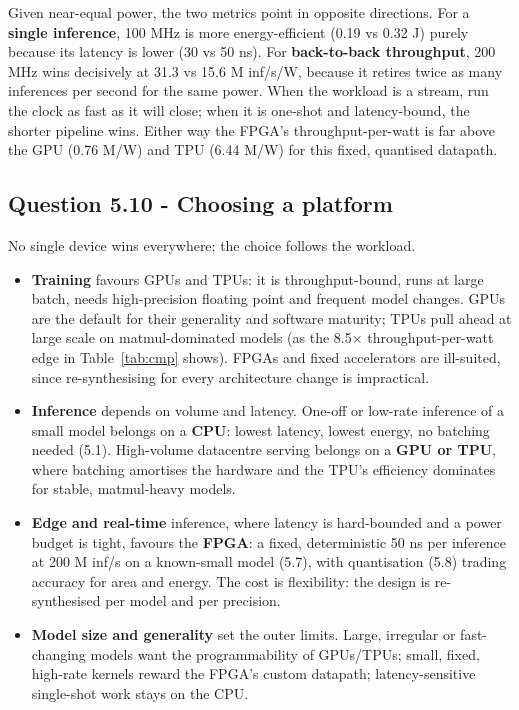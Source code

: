 \documentclass[11pt,a4paper]{article}
\newcommand{\Q}[1]{\subsection*{Question #1}}
\begin{document}
Given near-equal power, the two metrics point in opposite directions. For a \textbf{single inference}, 100 MHz is more energy-efficient (0.19 vs 0.32 \textmu J) purely because its latency is lower (30 vs 50 ns). For \textbf{back-to-back throughput}, 200 MHz wins decisively at 31.3 vs 15.6 M inf/s/W, because it retires twice as many inferences per second for the same power. When the workload is a stream, run the clock as fast as it will close; when it is one-shot and latency-bound, the shorter pipeline wins. Either way the FPGA's throughput-per-watt is far above the GPU (0.76 M/W) and TPU (6.44 M/W) for this fixed, quantised datapath.

\Q{5.10 - Choosing a platform}

No single device wins everywhere; the choice follows the workload.

\begin{itemize}\setlength\itemsep{0.15em}
    \item \textbf{Training} favours GPUs and TPUs: it is throughput-bound, runs at large batch, needs high-precision floating point and frequent model changes. GPUs are the default for their generality and software maturity; TPUs pull ahead at large scale on matmul-dominated models (as the 8.5$\times$ throughput-per-watt edge in Table~\ref{tab:cmp} shows). FPGAs and fixed accelerators are ill-suited, since re-synthesising for every architecture change is impractical.
    \item \textbf{Inference} depends on volume and latency. One-off or low-rate inference of a small model belongs on a \textbf{CPU}: lowest latency, lowest energy, no batching needed (5.1). High-volume datacentre serving belongs on a \textbf{GPU or TPU}, where batching amortises the hardware and the TPU's efficiency dominates for stable, matmul-heavy models.
    \item \textbf{Edge and real-time} inference, where latency is hard-bounded and a power budget is tight, favours the \textbf{FPGA}: a fixed, deterministic 50 ns per inference at 200 M inf/s on a known-small model (5.7), with quantisation (5.8) trading accuracy for area and energy. The cost is flexibility: the design is re-synthesised per model and per precision.
    \item \textbf{Model size and generality} set the outer limits. Large, irregular or fast-changing models want the programmability of GPUs/TPUs; small, fixed, high-rate kernels reward the FPGA's custom datapath; latency-sensitive single-shot work stays on the CPU.
\end{itemize}
\end{document}

